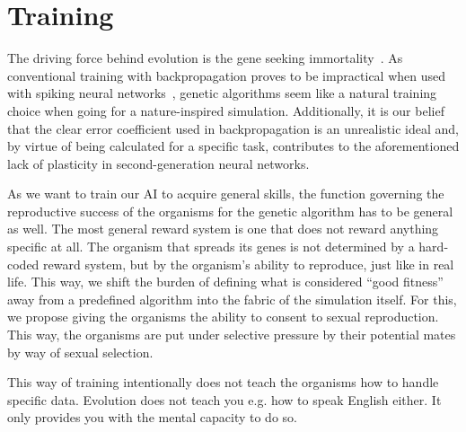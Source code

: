 \section{Training}
The driving force behind evolution is the gene seeking immortality~\cite{Dawkins1976}.
As conventional training with backpropagation proves to be impractical when used with
spiking neural networks~\cite{Paugam-Moisy2012}, genetic algorithms seem like a natural training choice
when going for a nature-inspired simulation. Additionally, it is our belief that the clear error
coefficient used in backpropagation is an unrealistic ideal and, by virtue of being calculated for
a specific task, contributes to the aforementioned lack of plasticity in second-generation neural networks.

As we want to train our AI to acquire general skills, the function governing the reproductive success of
the organisms for the genetic algorithm has to be general as well. The most general reward system
is one that does not reward anything specific at all. The organism that spreads its 
genes is not determined by a hard-coded reward system, but by the organism's ability to reproduce, 
just like in real life. This way, we shift the burden of defining what is considered ``good fitness''
away from a predefined algorithm into the fabric of the simulation itself.
For this, we propose giving the organisms the ability to consent to sexual reproduction.
This way, the organisms are put under selective pressure by their potential mates 
by way of sexual selection.~\cite{Dawkins1982}

This way of training intentionally does not teach the organisms how to handle specific data.
Evolution does not teach you e.g. how to speak English either. It only provides you with the mental
capacity to do so.
